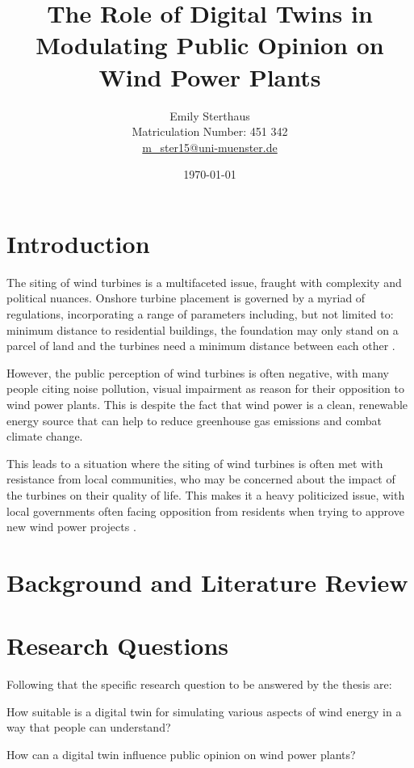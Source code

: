 \documentclass[11pt, titlepage, a4paper]{article}
\title{The Role of Digital Twins in Modulating Public Opinion on Wind Power Plants}
\author{Emily Sterthaus \\ Matriculation Number: 451 342 \\ \href{mailto:m_ster15@uni-muenster.de}{m\_ster15@uni-muenster.de}}
\affil{Institute of Geoinformatics, University of Münster}
\date{\today}
\begin{document}
\maketitle


\newpage
\begin{linenumbers}
    \section{Introduction}
    The siting of wind turbines is a multifaceted issue, fraught with complexity and political nuances. Onshore
    turbine placement is governed by a myriad of regulations, incorporating a range of parameters including, but not
    limited to: minimum distance to residential buildings, the foundation may only stand on a parcel of land and the
    turbines need a minimum distance between each other
    \cite{niedersachsischesministeriumfurumweltenergieundklimaschutzPlanungUndGenehmigung2021}.

    However, the public perception of wind turbines is often negative, with many people citing noise pollution, visual impairment as reason for their opposition to wind power plants. This is despite the fact that wind power is a clean, renewable energy source that can help to reduce greenhouse gas emissions and combat climate change.

    This leads to a situation where the siting of wind turbines is often met with resistance from local communities, who may be concerned about the impact of the turbines on their quality of life. This makes it a heavy politicized issue, with local governments often facing opposition from residents when trying to approve new wind power projects \cite{kwasniewskiWindenergieVerhindertAntiWindkraftBewegung2021}.


    \section{Background and Literature Review}

    \section{Research Questions}
    Following that the specific research question to be answered by the thesis are:
    \begin{questions}
        \item \label{rq:first_q} How suitable is a digital twin for simulating various aspects of wind energy in a way that people can understand?
        \item \label{rq:second_q} How can a digital twin influence public opinion on wind power plants?
    \end{questions}


\end{linenumbers}
\end{document}
